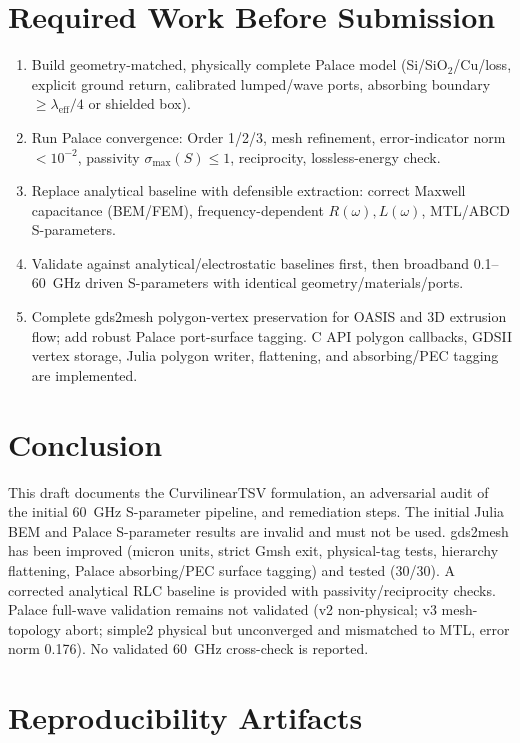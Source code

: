 \documentclass[12pt]{article}
\theoremstyle{definition}
\begin{document}
\section{Required Work Before Submission}

\begin{enumerate}
  \item Build geometry-matched, physically complete Palace model (Si/SiO$_2$/Cu/loss, explicit ground return, calibrated lumped/wave ports, absorbing boundary $\ge \lambda_{\mathrm{eff}}/4$ or shielded box).
  \item Run Palace convergence: Order 1/2/3, mesh refinement, error-indicator norm $<10^{-2}$, passivity $\sigma_{\max}(S)\le 1$, reciprocity, lossless-energy check.
  \item Replace analytical baseline with defensible extraction: correct Maxwell capacitance (BEM/FEM), frequency-dependent $R(\omega),L(\omega)$, MTL/ABCD S-parameters.
  \item Validate against analytical/electrostatic baselines first, then broadband 0.1--60~GHz driven S-parameters with identical geometry/materials/ports.
  \item Complete gds2mesh polygon-vertex preservation for OASIS and 3D extrusion flow; add robust Palace port-surface tagging. C API polygon callbacks, GDSII vertex storage, Julia polygon writer, flattening, and absorbing/PEC tagging are implemented.
\end{enumerate}

\section{Conclusion}

This draft documents the CurvilinearTSV formulation, an adversarial audit of the initial 60~GHz S-parameter pipeline, and remediation steps. The initial Julia BEM and Palace S-parameter results are invalid and must not be used. gds2mesh has been improved (micron units, strict Gmsh exit, physical-tag tests, hierarchy flattening, Palace absorbing/PEC surface tagging) and tested (30/30). A corrected analytical RLC baseline is provided with passivity/reciprocity checks. Palace full-wave validation remains not validated (v2 non-physical; v3 mesh-topology abort; simple2 physical but unconverged and mismatched to MTL, error norm 0.176). No validated 60~GHz cross-check is reported.

\appendix

\section{Reproducibility Artifacts}
\end{document}
